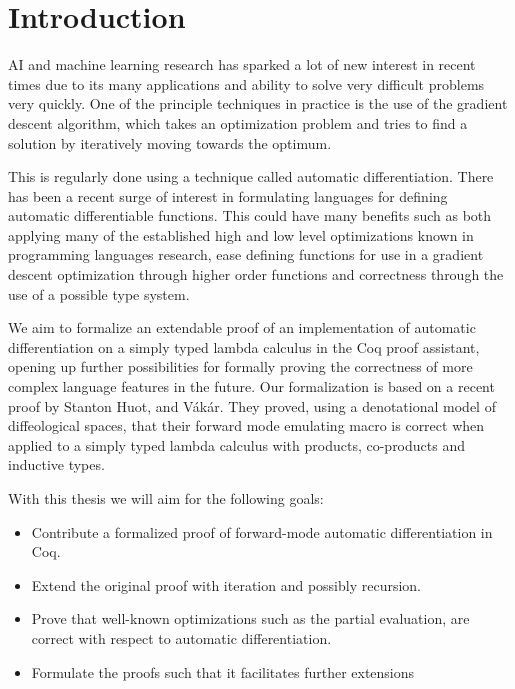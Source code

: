 \documentclass[a4, 12pt, final]{article}
\begin{document}
\newpage

\setcounter{page}{2}
\tableofcontents
\newpage

\section{Introduction}

AI and machine learning research has sparked a lot of new interest in recent times due to its many applications and ability to solve very difficult problems very quickly.
One of the principle techniques in practice is the use of the gradient descent algorithm, which takes an optimization problem and tries to find a solution by iteratively moving towards the optimum.

This is regularly done using a technique called automatic differentiation.
There has been a recent surge of interest in formulating languages for defining automatic differentiable functions.
This could have many benefits such as both applying many of the established high and low level optimizations known in programming languages research, ease defining functions for use in a gradient descent optimization through higher order functions and correctness through the use of a possible type system.

We aim to formalize an extendable proof of an implementation of automatic differentiation on a simply typed lambda calculus in the Coq proof assistant, opening up further possibilities for formally proving the correctness of more complex language features in the future.
Our formalization is based on a recent proof by Stanton Huot, and V\'{a}k\'{a}r\cite{huot2020correctness}.
They proved, using a denotational model of diffeological spaces, that their forward mode emulating macro is correct when applied to a simply typed lambda calculus with products, co-products and inductive types.


With this thesis we will aim for the following goals:
\begin{itemize}
  \item Contribute a formalized proof of forward-mode automatic differentiation in Coq.
  \item Extend the original proof with iteration and possibly recursion.
  \item Prove that well-known optimizations such as the partial evaluation, are correct with respect to automatic differentiation.
  \item Formulate the proofs such that it facilitates further extensions
\end{itemize}
\end{document}
